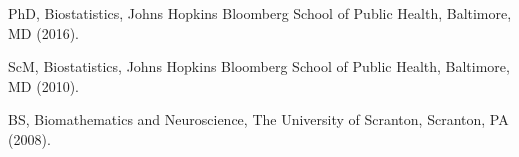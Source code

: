 \item PhD, Biostatistics, Johns Hopkins Bloomberg School of Public Health, Baltimore, MD (2016).
\item ScM, Biostatistics, Johns Hopkins Bloomberg School of Public Health, Baltimore, MD (2010).
\item BS, Biomathematics and Neuroscience, The University of Scranton, Scranton, PA (2008).

